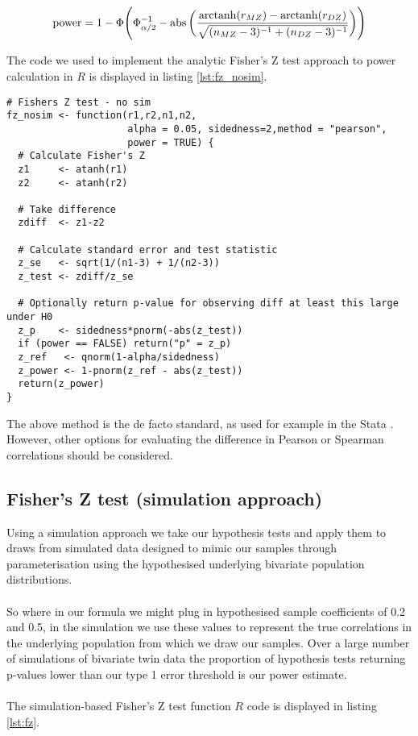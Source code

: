 $$ \operatorname{power} = 1- \Phi \Bigg(\Phi_{\alpha/2}^{-1} -  \operatorname{abs}\bigg(  \frac{\operatorname{arctanh}(r_{MZ}) - \operatorname{arctanh}(r_{DZ})}{\sqrt{(n_{MZ}-3)^{-1} + (n_{DZ}-3)^{-1}}}  \bigg)  \Bigg) $$ 

The code we used to implement the analytic Fisher's Z test approach to power calculation in $R$ is displayed in listing \ref{lst:fz_nosim}.

\begin{lstlisting}[float=h,caption={Fisher's Z test (analytic approach)},label={lst:fz_nosim}]
# Fishers Z test - no sim
fz_nosim <- function(r1,r2,n1,n2,
                     alpha = 0.05, sidedness=2,method = "pearson",
                     power = TRUE) {
  # Calculate Fisher's Z
  z1     <- atanh(r1)
  z2     <- atanh(r2)
  
  # Take difference
  zdiff  <- z1-z2
  
  # Calculate standard error and test statistic
  z_se   <- sqrt(1/(n1-3) + 1/(n2-3))
  z_test <- zdiff/z_se
  
  # Optionally return p-value for observing diff at least this large under H0
  z_p    <- sidedness*pnorm(-abs(z_test))
  if (power == FALSE) return("p" = z_p)
  z_ref   <- qnorm(1-alpha/sidedness)
  z_power <- 1-pnorm(z_ref - abs(z_test))
  return(z_power)
}
\end{lstlisting}

The above method is the de facto standard, as used for example in the Stata  \cite{StataCorp2013}.  However, other options for evaluating the difference in Pearson or Spearman correlations should be considered.  

\subsection{Fisher's Z test (simulation approach)}
Using a simulation approach we take our hypothesis tests and apply them to draws from simulated data designed to mimic our samples through parameterisation using the hypothesised underlying bivariate population distributions.  
\\
\\
So where in our formula we might plug in hypothesised sample coefficients of 0.2 and 0.5, in the simulation we use these values to represent the true correlations in the underlying population from which we draw our samples.  Over a large number of simulations of bivariate twin data the proportion of hypothesis tests returning p-values lower than our type 1 error threshold is our power estimate.
\\
\\
The simulation-based Fisher's Z test function $R$ code is displayed in listing \ref{lst:fz}.

